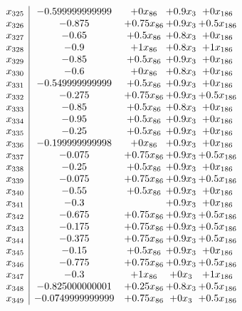 \documentclass[11pt]{article}
\begin{document}
\[\begin{array}{c| c c@{\hskip 2pt} c@{\hskip 2pt} c@{\hskip 2pt} }
 x_{325}   &  -0.599999999999 & + 0 x_{86} & + 0.9 x_{3} & + 0 x_{186}\\
 x_{326}   &  -0.875 & + 0.75 x_{86} & + 0.9 x_{3} & + 0.5 x_{186}\\
 x_{327}   &  -0.65 & + 0.5 x_{86} & + 0.8 x_{3} & + 0 x_{186}\\
 x_{328}   &  -0.9 & + 1 x_{86} & + 0.8 x_{3} & + 1 x_{186}\\
 x_{329}   &  -0.85 & + 0.5 x_{86} & + 0.9 x_{3} & + 0 x_{186}\\
 x_{330}   &  -0.6 & + 0 x_{86} & + 0.8 x_{3} & + 0 x_{186}\\
 x_{331}   &  -0.549999999999 & + 0.5 x_{86} & + 0.9 x_{3} & + 0 x_{186}\\
 x_{332}   &  -0.275 & + 0.75 x_{86} & + 0.9 x_{3} & + 0.5 x_{186}\\
 x_{333}   &  -0.85 & + 0.5 x_{86} & + 0.8 x_{3} & + 0 x_{186}\\
 x_{334}   &  -0.95 & + 0.5 x_{86} & + 0.9 x_{3} & + 0 x_{186}\\
 x_{335}   &  -0.25 & + 0.5 x_{86} & + 0.9 x_{3} & + 0 x_{186}\\
 x_{336}   &  -0.199999999998 & + 0 x_{86} & + 0.9 x_{3} & + 0 x_{186}\\
 x_{337}   &  -0.075 & + 0.75 x_{86} & + 0.9 x_{3} & + 0.5 x_{186}\\
 x_{338}   &  -0.25 & + 0.5 x_{86} & + 0.9 x_{3} & + 0 x_{186}\\
 x_{339}   &  -0.075 & + 0.75 x_{86} & + 0.9 x_{3} & + 0.5 x_{186}\\
 x_{340}   &  -0.55 & + 0.5 x_{86} & + 0.9 x_{3} & + 0 x_{186}\\
 x_{341}   &  -0.3  &   & + 0.9 x_{3} & + 0 x_{186}\\
 x_{342}   &  -0.675 & + 0.75 x_{86} & + 0.9 x_{3} & + 0.5 x_{186}\\
 x_{343}   &  -0.175 & + 0.75 x_{86} & + 0.9 x_{3} & + 0.5 x_{186}\\
 x_{344}   &  -0.375 & + 0.75 x_{86} & + 0.9 x_{3} & + 0.5 x_{186}\\
 x_{345}   &  -0.15 & + 0.5 x_{86} & + 0.9 x_{3} & + 0 x_{186}\\
 x_{346}   &  -0.775 & + 0.75 x_{86} & + 0.9 x_{3} & + 0.5 x_{186}\\
 x_{347}   &  -0.3 & + 1 x_{86} & + 0 x_{3} & + 1 x_{186}\\
 x_{348}   &  -0.825000000001 & + 0.25 x_{86} & + 0.8 x_{3} & + 0.5 x_{186}\\
 x_{349}   &  -0.0749999999999 & + 0.75 x_{86} & + 0 x_{3} & + 0.5 x_{186}\\

\end{array}\]
\end{document}
